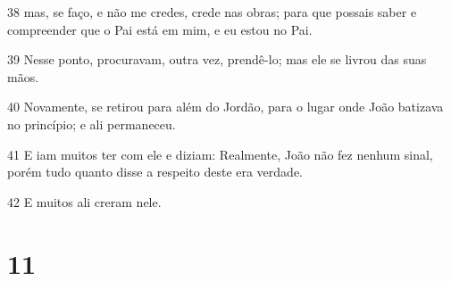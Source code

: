 \par 38 mas, se faço, e não me credes, crede nas obras; para que possais saber e compreender que o Pai está em mim, e eu estou no Pai.
\par 39 Nesse ponto, procuravam, outra vez, prendê-lo; mas ele se livrou das suas mãos.
\par 40 Novamente, se retirou para além do Jordão, para o lugar onde João batizava no princípio; e ali permaneceu.
\par 41 E iam muitos ter com ele e diziam: Realmente, João não fez nenhum sinal, porém tudo quanto disse a respeito deste era verdade.
\par 42 E muitos ali creram nele.

\chapter{11}

